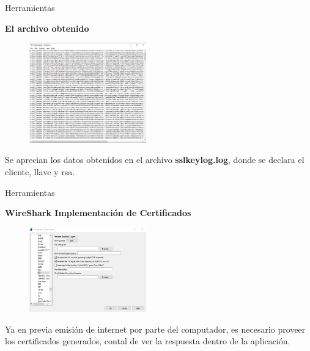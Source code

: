 \begin{frame}[t,fragile]{Herramientas}

\textbf{El archivo obtenido}

\begin{figure} 
\vspace{2pt}
  \begin{center}
    \includegraphics[width=0.45\textwidth]{ssllog.png}
    \label{fig:databaseUserTable}
  \end{center}
  \vspace{2pt}
\end{figure} 

\bigskip

Se aprecian los datos obtenidos en el archivo \textbf{sslkeylog.log}, donde se declara el cliente, llave y rsa.

\begin{center}
   
\end{center}

\end{frame}

\begin{frame}[t,fragile]{Herramientas}

\textbf{WireShark Implementación de Certificados}

\begin{figure} 
\vspace{2pt}
  \begin{center}
    \includegraphics[width=0.45\textwidth]{wiressl.png}
    \label{fig:databaseUserTable}
  \end{center}
  \vspace{2pt}
\end{figure} 

\bigskip

Ya en previa emisión de internet por parte del computador, es necesario proveer los certificados generados, contal de ver la respuesta dentro de la aplicación.

\begin{center}
   
\end{center}

\end{frame}

